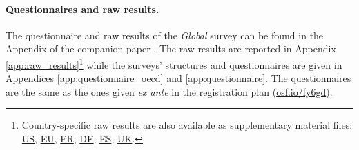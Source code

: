 \begin{small}
\paragraph{\small Questionnaires and raw results.} %
The questionnaire and raw results of the \textit{Global} survey can be found in the Appendix of the companion paper \citep{dechezlepretre_fighting_2022}. %
The raw results are reported in Appendix \ref{app:raw_results}\footnote{Country-specific raw results are also available as supplementary material files:  \href{https://github.com/bixiou/international_attitudes_toward_global_policies/raw/main/paper/app_desc_stats_US.pdf}{US}, \href{https://github.com/bixiou/international_attitudes_toward_global_policies/raw/main/paper/app_desc_stats_EU.pdf}{EU}, \href{https://github.com/bixiou/international_attitudes_toward_global_policies/raw/main/paper/app_desc_stats_FR.pdf}{FR}, \href{https://github.com/bixiou/international_attitudes_toward_global_policies/raw/main/paper/app_desc_stats_DE.pdf}{DE}, \href{https://github.com/bixiou/international_attitudes_toward_global_policies/raw/main/paper/app_desc_stats_ES.pdf}{ES}, \href{https://github.com/bixiou/international_attitudes_toward_global_policies/raw/main/paper/app_desc_stats_UK.pdf}{UK}.} while the surveys' structures and questionnaires are given in Appendices \ref{app:questionnaire_oecd} and \ref{app:questionnaire}. The questionnaires are the same as the ones given \textit{ex ante} in the registration plan (\href{https://osf.io/fy6gd}{osf.io/fy6gd}).



\end{small}
